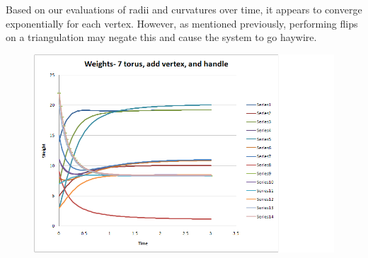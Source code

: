 \documentclass[12pt]{article}
\begin{document}
\noindent Based on our evaluations of radii and curvatures over time, it appears to converge exponentially for each vertex. However, as mentioned previously, performing flips on a triangulation may negate this and cause the system to go haywire. 

\begin{figure}[ht]
\centering
\includegraphics[scale = 0.9]{torus7addvaddhweights.png}
\end{figure}

\newpage
\end{document}
